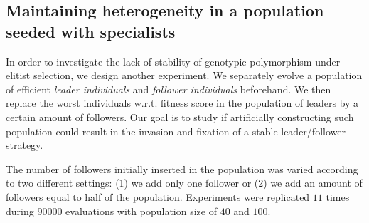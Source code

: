   \subsection{Maintaining heterogeneity in a population seeded with specialists}
    In order to investigate the lack of stability of genotypic polymorphism under elitist selection, we design another experiment. We separately evolve a population of efficient \emph{leader individuals} and \emph{follower individuals} beforehand. We then replace the worst individuals w.r.t. fitness score in the population of leaders by a certain amount of followers. Our goal is to study if artificially constructing such population could result in the invasion and fixation of a stable leader/follower strategy.

    The number of followers initially inserted in the population was varied according to two different settings: (1) we add only one follower or (2) we add an amount of followers equal to half of the population. Experiments were replicated $11$ times during $90000$ evaluations with population size of $40$ and $100$.

    \begin{table}[ht]
      \caption{\textbf{Strategies evolved by the best individuals under elitist selection when adding followers.} Repartition of the different strategies adopted by the best individuals at last evaluation in each of the replicates for different population sizes \(N\). We indicate in each cell the number of simulations where a particular strategy evolved. Populations were evolved under a \((\mu + \lambda)\) elitist selection, with \(\mu = \frac{N}{2}\) and \(\lambda = \frac{N}{2}\). The population was initially seeded with a population of leaders in which we added a specific amount of followers. In the table "L/F" stands for leader/follower and "NC" for "Non-Cooperative".}
      \label{tab:elitistInvasionStrategies}
    \end{table}


